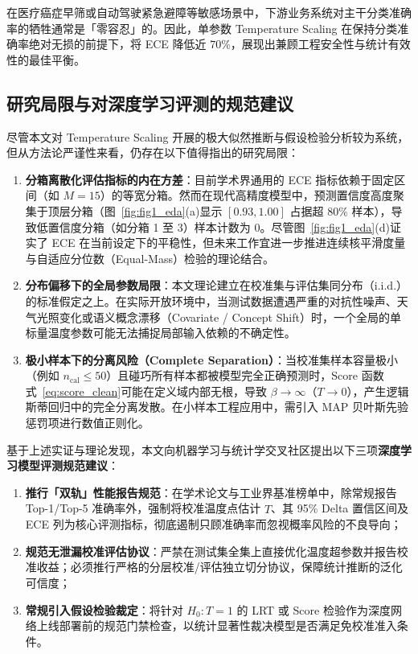 在医疗癌症早筛或自动驾驶紧急避障等敏感场景中，下游业务系统对主干分类准确率的牺牲通常是「零容忍」的。因此，单参数 Temperature Scaling 在保持分类准确率绝对无损的前提下，将 ECE 降低近 $70\%$，展现出兼顾工程安全性与统计有效性的最佳平衡。

\subsection{研究局限与对深度学习评测的规范建议}

尽管本文对 Temperature Scaling 开展的极大似然推断与假设检验分析较为系统，但从方法论严谨性来看，仍存在以下值得指出的研究局限：
\begin{enumerate}
\item \textbf{分箱离散化评估指标的内在方差}：目前学术界通用的 ECE 指标依赖于固定区间（如 $M=15$）的等宽分箱。然而在现代高精度模型中，预测置信度高度聚集于顶层分箱（图~\ref{fig:fig1_eda}(a)显示 $[0.93, 1.00]$ 占据超 $80\%$ 样本），导致低置信度分箱（如分箱 1 至 3）样本计数为 0。尽管图~\ref{fig:fig1_eda}(d)证实了 ECE 在当前设定下的平稳性，但未来工作宜进一步推进连续核平滑度量与自适应分位数（Equal-Mass）检验的理论结合。
\item \textbf{分布偏移下的全局参数局限}：本文理论建立在校准集与评估集同分布（i.i.d.）的标准假定之上。在实际开放环境中，当测试数据遭遇严重的对抗性噪声、天气光照变化或语义概念漂移（Covariate / Concept Shift）时，一个全局的单标量温度参数可能无法捕捉局部输入依赖的不确定性。
\item \textbf{极小样本下的分离风险（Complete Separation）}：当校准集样本容量极小（例如 $n_{\mathrm{cal}} \le 50$）且碰巧所有样本都被模型完全正确预测时，Score 函数式~\eqref{eq:score_clean}可能在定义域内部无根，导致 $\beta \to \infty$（$T \to 0$），产生逻辑斯蒂回归中的完全分离发散。在小样本工程应用中，需引入 MAP 贝叶斯先验惩罚项进行数值正则化。
\end{enumerate}

基于上述实证与理论发现，本文向机器学习与统计学交叉社区提出以下三项\textbf{深度学习模型评测规范建议}：
\begin{enumerate}
\item \textbf{推行「双轨」性能报告规范}：在学术论文与工业界基准榜单中，除常规报告 Top-1/Top-5 准确率外，强制将校准温度点估计 $\hat T$、其 95\% Delta 置信区间及 ECE 列为核心评测指标，彻底遏制只顾准确率而忽视概率风险的不良导向；
\item \textbf{规范无泄漏校准评估协议}：严禁在测试集全集上直接优化温度超参数并报告校准收益；必须推行严格的分层校准/评估独立切分协议，保障统计推断的泛化可信度；
\item \textbf{常规引入假设检验裁定}：将针对 $H_0: T=1$ 的 LRT 或 Score 检验作为深度网络上线部署前的规范门禁检查，以统计显著性裁决模型是否满足免校准准入条件。
\end{enumerate}

